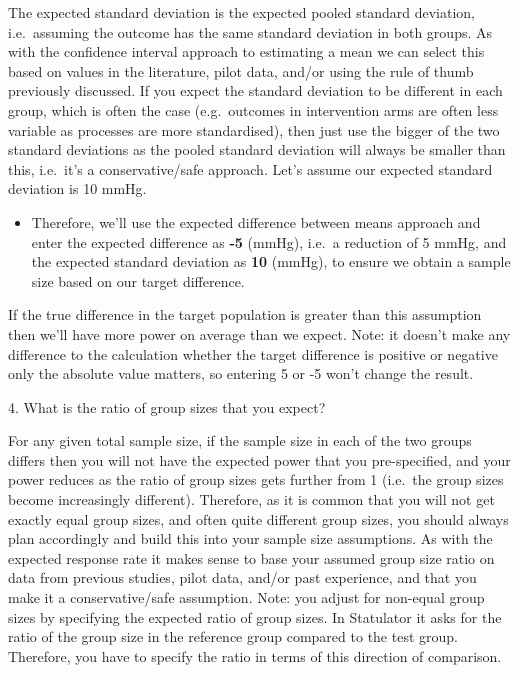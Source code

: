 \documentclass[
]{book}
\providecommand{\tightlist}{%
  \setlength{\itemsep}{0pt}\setlength{\parskip}{0pt}}
\begin{document}
The expected standard deviation is the expected pooled standard deviation, i.e.~assuming the outcome has the same standard deviation in both groups. As with the confidence interval approach to estimating a mean we can select this based on values in the literature, pilot data, and/or using the rule of thumb previously discussed. If you expect the standard deviation to be different in each group, which is often the case (e.g.~outcomes in intervention arms are often less variable as processes are more standardised), then just use the bigger of the two standard deviations as the pooled standard deviation will always be smaller than this, i.e.~it's a conservative/safe approach. Let's assume our expected standard deviation is 10 mmHg.

\begin{itemize}
\tightlist
\item
  Therefore, we'll use the expected difference between means approach and enter the expected difference as \textbf{-5} (mmHg), i.e.~a reduction of 5 mmHg, and the expected standard deviation as \textbf{10} (mmHg), to ensure we obtain a sample size based on our target difference.
\end{itemize}

If the true difference in the target population is greater than this assumption then we'll have more power on average than we expect. Note: it doesn't make any difference to the calculation whether the target difference is positive or negative only the absolute value matters, so entering 5 or -5 won't change the result.

4. What is the ratio of group sizes that you expect?

For any given total sample size, if the sample size in each of the two groups differs then you will not have the expected power that you pre-specified, and your power reduces as the ratio of group sizes gets further from 1 (i.e.~the group sizes become increasingly different). Therefore, as it is common that you will not get exactly equal group sizes, and often quite different group sizes, you should always plan accordingly and build this into your sample size assumptions. As with the expected response rate it makes sense to base your assumed group size ratio on data from previous studies, pilot data, and/or past experience, and that you make it a conservative/safe assumption. Note: you adjust for non-equal group sizes by specifying the expected ratio of group sizes. In Statulator it asks for the ratio of the group size in the reference group compared to the test group. Therefore, you have to specify the ratio in terms of this direction of comparison.
\end{document}
